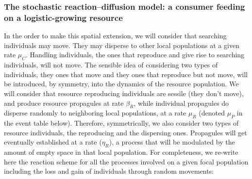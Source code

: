 \subsubsection*{The stochastic reaction--diffusion model: a consumer feeding on a logistic-growing resource}
In the order to make this spatial extension, we will consider that searching individuals may move. They may disperse to other local populations at a given rate $\mu_C$. Handling individuals, the ones that reproduce and give rise to searching individuals, will not move. The sensible idea of considering two types of individuals, they ones that move and they ones that reproduce but not move, will be introduced, by symmetry, into the dynamics of the resource population. We will consider that resource reproducing individuals are sessile (they don't move), and produce resource propagules at rate $\beta_R$, while individual propagules do disperse randomly to neighboring local populations, at a rate $\mu_R$ (denoted $\mu_P$ in the event table below). Therefore, symmetrically, we also consider two types of resource individuals, the reproducing and the dispersing ones. Propagules will get eventually established at a rate ($\eta_R$), a process that will be modulated by the amount of empty space in that local population. For completeness, we re-write here the reaction scheme for all the processes involved on a given focal population including the loss and gain of individuals through random movements:   
